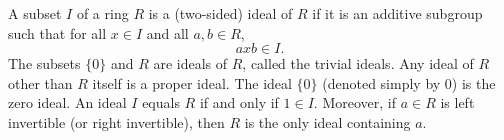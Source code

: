 A subset $I$ of a ring $R$ is a (two-sided) ideal of $R$ if it is an additive subgroup such that for all $x \in I$ and all $a, b \in R$,
$$axb \in I.$$
The subsets $\{0\}$ and $R$ are ideals of $R$, called the trivial ideals. Any ideal of $R$ other than $R$ itself is a proper ideal. The ideal $\{0\}$ (denoted simply by $0$) is the zero ideal. An ideal $I$ equals $R$ if and only if $1 \in I$. Moreover, if $a \in R$ is left invertible (or right invertible), then $R$ is the only ideal containing $a$.
